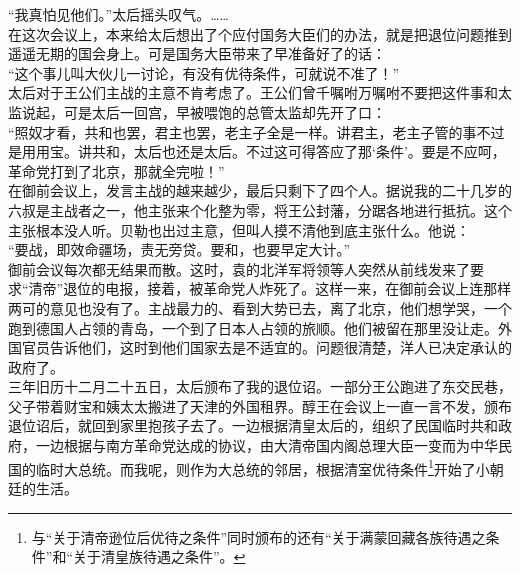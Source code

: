 “我真怕见他们。”太后摇头叹气。……\\

在这次会议上，本来给太后想出了个应付国务大臣们的办法，就是把退位问题推到遥遥无期的国会身上。可是国务大臣带来了早准备好了的话：\\

“这个事儿叫大伙儿一讨论，有没有优待条件，可就说不准了！”\\

太后对于王公们主战的主意不肯考虑了。王公们曾千嘱咐万嘱咐不要把这件事和太监说起，可是太后一回宫，早被喂饱的总管太监却先开了口：\\

“照奴才看，共和也罢，君主也罢，老主子全是一样。讲君主，老主子管的事不过是用用宝。讲共和，太后也还是太后。不过这可得答应了那‘条件’。要是不应呵，革命党打到了北京，那就全完啦！”\\

在御前会议上，发言主战的越来越少，最后只剩下了四个人。据说我的二十几岁的六叔是主战者之一，他主张来个化整为零，将王公封藩，分踞各地进行抵抗。这个主张根本没人听。贝勒也出过主意，但叫人摸不清他到底主张什么。他说：\\

“要战，即效命疆场，责无旁贷。要和，也要早定大计。”\\

御前会议每次都无结果而散。这时，袁的北洋军将领等人突然从前线发来了要求“清帝”退位的电报，接着，被革命党人炸死了。这样一来，在御前会议上连那样两可的意见也没有了。主战最力的、看到大势已去，离了北京，他们想学哭，一个跑到德国人占领的青岛，一个到了日本人占领的旅顺。他们被留在那里没让走。外国官员告诉他们，这时到他们国家去是不适宜的。问题很清楚，洋人已决定承认的政府了。\\

三年旧历十二月二十五日，太后颁布了我的退位诏。一部分王公跑进了东交民巷，父子带着财宝和姨太太搬进了天津的外国租界。醇王在会议上一直一言不发，颁布退位诏后，就回到家里抱孩子去了。一边根据清皇太后的，组织了民国临时共和政府，一边根据与南方革命党达成的协议，由大清帝国内阁总理大臣一变而为中华民国的临时大总统。而我呢，则作为大总统的邻居，根据清室优待条件\footnote{与“关于清帝逊位后优待之条件”同时颁布的还有“关于满蒙回藏各族待遇之条件”和“关于清皇族待遇之条件”。}开始了小朝廷的生活。\\

